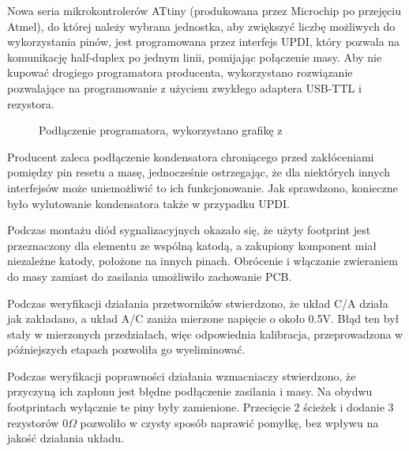 \documentclass[polish,engineer]{polsl-msth}
\begin{document}
Nowa seria mikrokontrolerów ATtiny (produkowana przez Microchip po przejęciu Atmel), do której należy wybrana jednostka, aby zwiększyć liczbę możliwych do wykorzystania pinów, jest programowana przez interfejs UPDI, który pozwala na komunikację half-duplex po jednym linii, pomijając połączenie masy. Aby nie kupować drogiego programatora producenta, wykorzystano rozwiązanie pozwalające na programowanie z użyciem zwykłego adaptera USB-TTL i rezystora\cite{pyupdi}.
\begin{figure}[hbtp]
\centering
     \caption{Podłączenie programatora, wykorzystano grafikę z \cite{pyupdi}\label{img:pyupdi}}
\end{figure}
Producent zaleca podłączenie kondensatora chroniącego przed zakłóceniami pomiędzy pin resetu a masę, jednocześnie ostrzegając, że dla niektórych innych interfejsów może uniemożliwić to ich funkcjonowanie\cite{avr_hardware}. Jak sprawdzono, konieczne było wylutowanie kondensatora także w przypadku UPDI.

Podczas montażu diód sygnalizacyjnych okazało się, że użyty footprint jest przeznaczony dla elementu ze wspólną katodą, a zakupiony komponent miał niezależne katody, położone na innych pinach. Obrócenie i włączanie zwieraniem do masy zamiast do zasilania umożliwiło zachowanie PCB.

Podczas weryfikacji działania przetworników stwierdzono, że układ C/A działa jak zakładano, a układ A/C zaniża mierzone napięcie o około 0.5V. Błąd ten był stały w mierzonych przedziałach, więc odpowiednia kalibracja, przeprowadzona w późniejszych etapach pozwoliła go wyeliminować.

Podczas weryfikacji poprawności działania wzmacniaczy stwierdzono, że przyczyną ich zapłonu jest błędne podłączenie zasilania i masy. Na obydwu footprintach wyłącznie te piny były zamienione. Przecięcie 2 ścieżek i dodanie 3 rezystorów $0\Omega$ pozwoliło w czysty sposób naprawić pomyłkę, bez wpływu na jakość działania układu.
\end{document}
